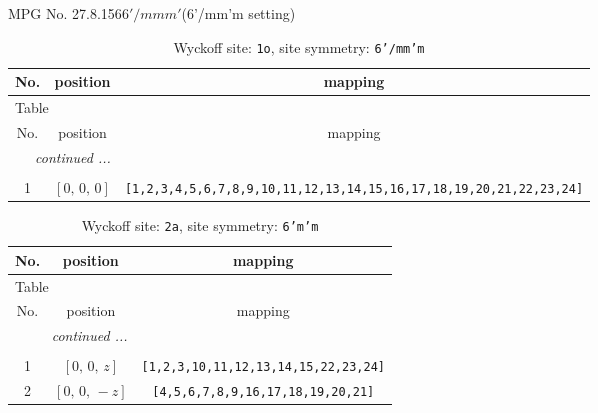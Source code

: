 \documentclass[fleqn,8pt]{jsarticle}
\begin{document}
\setcounter{MaxMatrixCols}{32}

\renewcommand{\tablename}{Table~}
\renewcommand{\figurename}{Figure~}
\begin{center}
\LARGE
MPG No. 27.8.156\quad$6'/mmm'$\quad(6'/mm'm setting)
\end{center}
\renewcommand{\arraystretch}{1.2}
\begin{longtable}{ccc}
\caption{Wyckoff site: {\tt 1o}, site symmetry: {\tt 6'/mm'm}}
 \\
 \hline \hline
No. & position & mapping \\ \hline \endfirsthead

\multicolumn{2}{l}{\tablename\ \thetable{}} \\
 \hline \hline
No. & position & mapping \\ \hline \endhead

 \hline \hline
\multicolumn{2}{r}{\footnotesize\it continued ...} \\ \endfoot

 \hline \hline
\multicolumn{2}{r}{} \\ \endlastfoot

1 & $\left[ 0,\, 0,\, 0 \right]$ & {\tt [1,2,3,4,5,6,7,8,9,10,11,12,13,14,15,16,17,18,19,20,21,22,23,24]} \\
\end{longtable}
\renewcommand{\arraystretch}{1.2}
\begin{longtable}{ccc}
\caption{Wyckoff site: {\tt 2a}, site symmetry: {\tt 6'm'm}}
 \\
 \hline \hline
No. & position & mapping \\ \hline \endfirsthead

\multicolumn{2}{l}{\tablename\ \thetable{}} \\
 \hline \hline
No. & position & mapping \\ \hline \endhead

 \hline \hline
\multicolumn{2}{r}{\footnotesize\it continued ...} \\ \endfoot

 \hline \hline
\multicolumn{2}{r}{} \\ \endlastfoot

1 & $\left[ 0,\, 0,\, z \right]$ & {\tt [1,2,3,10,11,12,13,14,15,22,23,24]} \\ \hline
2 & $\left[ 0,\, 0,\, - z \right]$ & {\tt [4,5,6,7,8,9,16,17,18,19,20,21]} \\
\end{longtable}
\renewcommand{\arraystretch}{1.2}
\end{document}
